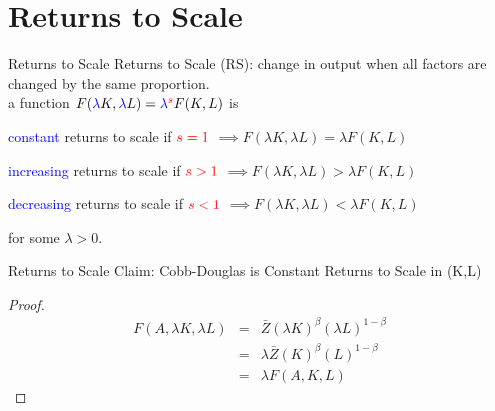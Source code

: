 \documentclass[notes,11pt, aspectratio=169, xcolor=table]{beamer}
\newcommand{\blue}[1]{\textcolor{blue}{#1}}
\newenvironment{wideitemize}{\itemize\addtolength{\itemsep}{10pt}}{\enditemize}
\begin{document}
\section{Returns to Scale}

\begin{frame}{Returns to Scale}
  \huge{Returns to Scale (RS): change in output when all factors are changed by the same proportion.} \\
  \vspace{20pt}
  a function $F(\textcolor{blue}{\lambda} K,\textcolor{blue}{\lambda} L) = \textcolor{blue}{\lambda}^{ \textcolor{red}{s}}  F( K, L)$ is
    \normalsize{\begin{wideitemize}
        \item \blue{constant} returns to scale if $\textcolor{red}{s = 1}$ $\implies F(\lambda K,\lambda L) = \lambda F(K,L)$
        \item \blue{increasing} returns to scale if $\textcolor{red}{s > 1}$ $\implies F(\lambda K,\lambda L) > \lambda F(K,L)$
        \item \blue{decreasing} returns to scale if $\textcolor{red}{s < 1}$ $\implies F(\lambda K,\lambda L) < \lambda F(K,L)$
        \end{wideitemize} }

        for some $\lambda > 0$.
\end{frame}


\begin{frame}{Returns to Scale}
  \Large Claim: Cobb-Douglas is Constant Returns to Scale in (K,L)  \vspace{20pt}
  \begin{proof}
  \begin{eqnarray*}
    F(A,\lambda K,\lambda L) &=& \bar{Z} (\lambda K)^\beta (\lambda L)^{1-\beta}  \\
    &=& \lambda \bar{Z}  (K)^\beta (L)^{1-\beta} \\
    &=& \lambda F(A, K,L)
  \end{eqnarray*}
  \end{proof}

\end{frame}
\end{document}
